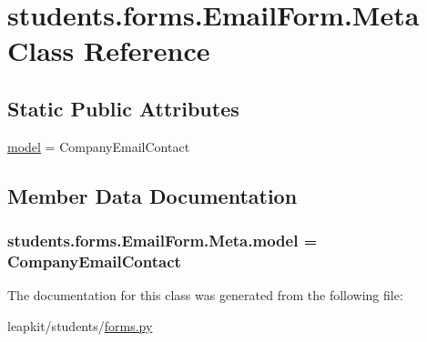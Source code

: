 \hypertarget{classstudents_1_1forms_1_1_email_form_1_1_meta}{\section{students.\-forms.\-Email\-Form.\-Meta Class Reference}
\label{classstudents_1_1forms_1_1_email_form_1_1_meta}
}
\subsection*{Static Public Attributes}
\begin{DoxyCompactItemize}
\item 
\hyperlink{classstudents_1_1forms_1_1_email_form_1_1_meta_abe8e42faf033097a51094be791e90d47}{model} = Company\-Email\-Contact
\end{DoxyCompactItemize}


\subsection{Member Data Documentation}
\hypertarget{classstudents_1_1forms_1_1_email_form_1_1_meta_abe8e42faf033097a51094be791e90d47}{
\subsubsection[{model}]{\setlength{\rightskip}{0pt plus 5cm}students.\-forms.\-Email\-Form.\-Meta.\-model = Company\-Email\-Contact\hspace{0.3cm}{\ttfamily [static]}}}\label{classstudents_1_1forms_1_1_email_form_1_1_meta_abe8e42faf033097a51094be791e90d47}


The documentation for this class was generated from the following file\-:\begin{DoxyCompactItemize}
\item 
leapkit/students/\hyperlink{forms_8py}{forms.\-py}\end{DoxyCompactItemize}
